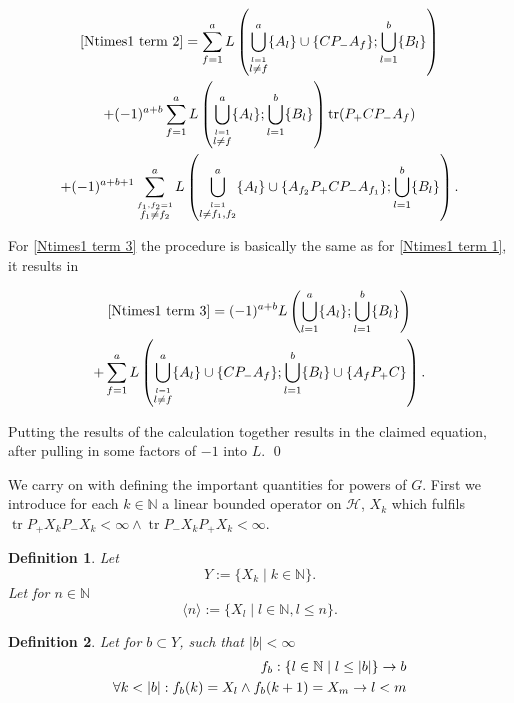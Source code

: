 \documentclass[b5paper,draft,openbib,12pt]{memoir}
\newtheorem{Def}{Definition}[section]
\DeclareMathOperator{\tr}{tr}
\begin{document}
\begin{multline}
\eqref{Ntimes1 term 2}=\sum_{f=1}^a L\left( \bigcup_{\stackrel{l=1}{l\neq f}}^a \{A_l\}\cup \{C P_- A_f\}; \bigcup_{l=1}^b \{B_l\}\right)\\
+(-1)^{a+b}\sum_{f=1}^a  L\left( \bigcup_{\stackrel{l=1}{l\neq f}}^a \{A_l\}; \bigcup_{l=1}^b \{B_l\} \right) \tr (P_+ C P_- A_f )\\
+(-1)^{a+b+1}\sum_{\stackrel{f_1,f_2=1}{f_1\neq f_2}}^a L\left( \bigcup_{\stackrel{l=1}{l\neq f_1,f_2}}^a \{A_l\} \cup \{A_{f_2} P_+CP_- A_{f_1} \}; \bigcup_{l=1}^b \{B_l\} \right).
\end{multline}

For \eqref{Ntimes1 term 3} the procedure is basically the same as for \eqref{Ntimes1 term 1}, it results in

\begin{multline}
\eqref{Ntimes1 term 3}= (-1)^{a+b} L\left( \bigcup_{l=1}^a \{A_l\}; \bigcup_{l=1}^b \{B_l\}\right)\\
+ \sum_{f=1}^a L\left( \bigcup_{\stackrel{l=1}{l \neq f}}^a \{A_l\}\cup \{C P_- A_f\}; \bigcup_{l=1}^b \{B_l\}\cup \{A_f P_+ C\}\right).
\end{multline}

Putting the results of the calculation together results in the claimed equation, after pulling in some factors of \(-1\) into \(L\). \qed

We carry on with defining the important quantities for powers of \(G\). First we introduce for each \(k \in \mathbb{N}\) a linear
bounded operator on \(\mathcal{H}\), \(X_k\) which fulfils \(\tr P_+ X_k P_- X_k<\infty\wedge \tr P_- X_k P_+ X_k<\infty\). 

\begin{Def}
Let 
\begin{equation*}
Y:=\{X_k\mid k\in\mathbb{N}\}.
\end{equation*}
Let for \(n\in\mathbb{N}\)
\begin{equation*}
\langle n\rangle := \{X_l\mid l\in\mathbb{N}, l\le n\}.
\end{equation*}
\end{Def}

\begin{Def}
Let for  \(b\subset Y\), such that \(|b|<\infty\)
\begin{align}\notag
f_b:\{l\in\mathbb{N}\mid l\le |b|\}\rightarrow b\\
\forall k<|b| : f_b(k)=X_l\wedge f_b(k+1)=X_m\rightarrow l<m
\end{align}
\end{Def}
\end{document}
